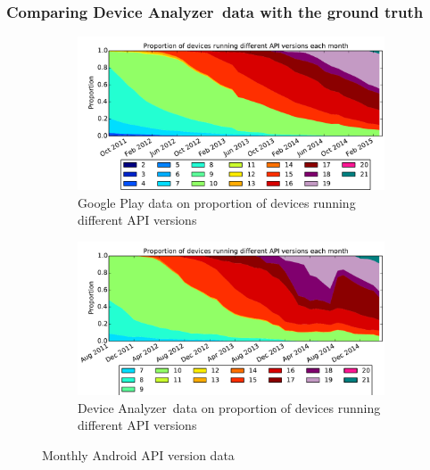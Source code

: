 \documentclass{llncs}
\newcommand{\da}{Device Analyzer}
\begin{document}
\subsubsection{Comparing \da\ data with the ground truth}
\label{sec:representative}
\begin{figure}[!h]
 \centering
 \begin{subfigure}[b]{\columnwidth}
 \includegraphics[width=\columnwidth]{figures/googleplayapi}
 \caption{Google Play data on proportion of devices running different API versions}
 \label{fig:play_api}
\end{subfigure}
\begin{subfigure}[b]{\columnwidth}
 \includegraphics[width=\columnwidth]{figures/norm_api_gpcomp}
 \caption{\da\ data on proportion of devices running different API versions}
 \label{fig:da_api}
\end{subfigure}
\caption{Monthly Android API version data}
\end{figure}
\end{document}
